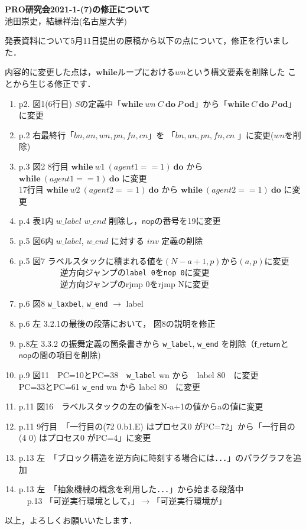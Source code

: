\documentclass{jarticle}
\begin{document}
\begin{center}
{\bf\Large PRO研究会{2021-1-(7)}の修正について}\\[10pt]
{\large 池田崇史，結縁祥治(名古屋大学)}
\end{center}
発表資料について5月11日提出の原稿から以下の点について，修正を行いました．

内容的に変更した点は，$\mathbf{while}$ループにおける$wn$という構文要素を削除した
ことから生じる修正です．

\begin{enumerate}
\item p2. 図1(6行目) $S$の定義中「$\mathbf{while}\ wn\ C\ \mathbf{do}\ P\ \mathbf{od}$」から「$\mathbf{while}\ C\ \mathbf{do}\ P\ \mathbf{od}$」に変更
\item p.2 右最終行「$bn,an,wn,pn,fn,cn$」を 「$bn,an,pn,fn,cn$ 」に変更($wn$を削除)
\item p.3 図2 8行目 $\mathbf{while}\ w1\ (agent1==1)\ \mathbf{do}$ から
         $\mathbf{while}\ (agent1==1)\ \mathbf{do}$ に変更\\
         17行目 $\mathbf{while}\ w2\ (agent2==1)\ \mathbf{do}$ から $\mathbf{while}\ (agent2==1)\ \mathbf{do}$
         に変更
\item p.4 表1内 $w\_label$ $w\_end$ 削除し，$\mathsf{nop}$の番号を19に変更
\item p.5 図6内 $w\_label$, $w\_end$ に対する $inv$ 定義の削除
\item p.5 図7 ラベルスタックに積まれる値を$(N-a+1,p)$から$(a,p)$に変更\\
　　　　　逆方向ジャンプの\texttt{label 0}を\texttt{nop 0}に変更\\
　　　　　逆方向ジャンプのrjmp 0をrjmp Nに変更
\item p.6 図8 \texttt{w\_laxbel}, \texttt{w\_end} $\rightarrow$ label
\item p.6 左 3.2.1の最後の段落において， 図8の説明を修正
\item p.8左 3.3.2 の振舞定義の箇条書きから \texttt{w\_label}, \texttt{w\_end} を削除（$\mathsf{f\_return}$と
$\mathsf{nop}$の間の項目を削除)
\item p.9 図11　PC=10とPC=38　\texttt{w\_label} wn から　label 80　に変更\\
          PC=33とPC=61  \texttt{w\_end}   wn から  label 80　に変更
\item p.11 図16　ラベルスタックの左の値をN-a+1の値からaの値に変更
\item p.11 9行目　「一行目の(72 0.b1.E) はプロセス0 がPC=72」から「一行目の(4 0) はプロセス0 がPC=4」に変更
\item p.13 左　「ブロック構造を逆方向に時刻する場合には．．．」のパラグラフを追加
\item p.13 左　「抽象機械の概念を利用した．．．」から始まる段落中\\
　p.13 「可逆実行環境として，」$\rightarrow$「可逆実行環境が」
\end{enumerate}

以上，よろしくお願いいたします．
\end{document}
